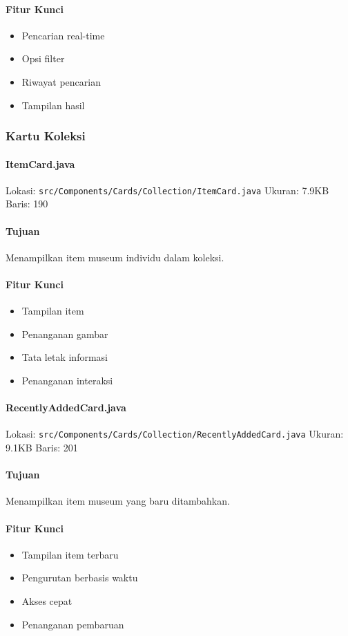 \documentclass[12pt,a4paper]{article}
\begin{document}
\paragraph{Fitur Kunci}
\begin{itemize}
    \item Pencarian real-time
    \item Opsi filter
    \item Riwayat pencarian
    \item Tampilan hasil
\end{itemize}

\subsubsection{Kartu Koleksi}
\paragraph{ItemCard.java}
Lokasi: \texttt{src/Components/Cards/Collection/ItemCard.java}
Ukuran: 7.9KB
Baris: 190

\paragraph{Tujuan}
Menampilkan item museum individu dalam koleksi.

\paragraph{Fitur Kunci}
\begin{itemize}
    \item Tampilan item
    \item Penanganan gambar
    \item Tata letak informasi
    \item Penanganan interaksi
\end{itemize}

\paragraph{RecentlyAddedCard.java}
Lokasi: \texttt{src/Components/Cards/Collection/RecentlyAddedCard.java}
Ukuran: 9.1KB
Baris: 201

\paragraph{Tujuan}
Menampilkan item museum yang baru ditambahkan.

\paragraph{Fitur Kunci}
\begin{itemize}
    \item Tampilan item terbaru
    \item Pengurutan berbasis waktu
    \item Akses cepat
    \item Penanganan pembaruan
\end{itemize}
\end{document}

